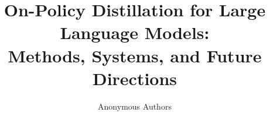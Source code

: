 \documentclass{article} %
\title{On-Policy Distillation for Large Language Models: \\ Methods, Systems, and Future Directions}
\author{Anonymous Authors}
\begin{document}
\ifcolmsubmission
\linenumbers
\fi

\maketitle
\end{document}
